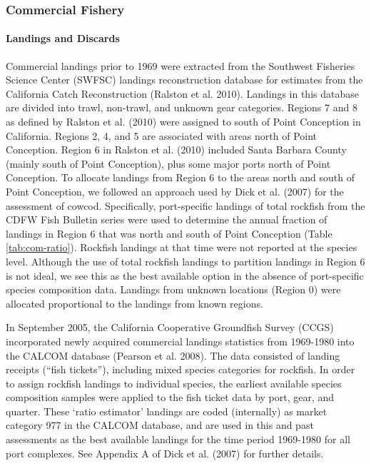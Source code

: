\documentclass[11pt,
  english,
  letterpaper,
]{article}
\begin{document}
\hypertarget{commercial-fishery}{%
\subsubsection{Commercial Fishery}\label{commercial-fishery}}

\hypertarget{landings-and-discards}{%
\paragraph{Landings and Discards}\label{landings-and-discards}}

\hfill\break

Commercial landings prior to 1969 were extracted from the Southwest Fisheries Science Center (SWFSC) landings reconstruction database for estimates from the California Catch Reconstruction (Ralston et al. 2010). Landings in this database are divided into trawl, non-trawl, and unknown gear categories. Regions 7 and 8 as defined by Ralston et al. (2010) were assigned to south of Point Conception in California. Regions 2, 4, and 5 are associated with areas north of Point Conception. Region 6 in Ralston et al. (2010) included Santa Barbara County (mainly south of Point Conception), plus some major ports north of Point Conception. To allocate landings from Region 6 to the areas north and south of Point Conception, we followed an approach used by Dick et al. (2007) for the assessment of cowcod. Specifically, port-specific landings of total rockfish from the CDFW Fish Bulletin series were used to determine the annual fraction of landings in Region 6 that was north and south of Point Conception (Table \ref{tab:com-ratio}). Rockfish landings at that time were not reported at the species level. Although the use of total rockfish landings to partition landings in Region 6 is not ideal, we see this as the best available option in the absence of port-specific species composition data. Landings from unknown locations (Region 0) were allocated proportional to the landings from known regions.

In September 2005, the California Cooperative Groundfish Survey (CCGS) incorporated newly acquired commercial landings statistics from 1969-1980 into the CALCOM database (Pearson et al. 2008). The data consisted of landing receipts (``fish tickets''), including mixed species categories for rockfish. In order to assign rockfish landings to individual species, the earliest available species composition samples were applied to the fish ticket data by port, gear, and quarter. These `ratio estimator' landings are coded (internally) as market category 977 in the CALCOM database, and are used in this and past assessments as the best available landings for the time period 1969-1980 for all port complexes. See Appendix A of Dick et al. (2007) for further details.
\end{document}
